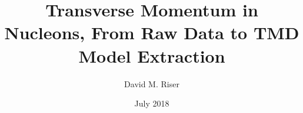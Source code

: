 \title{Transverse Momentum in Nucleons, From Raw Data to TMD Model Extraction}
\author{David M. Riser}
\date{July 2018}

